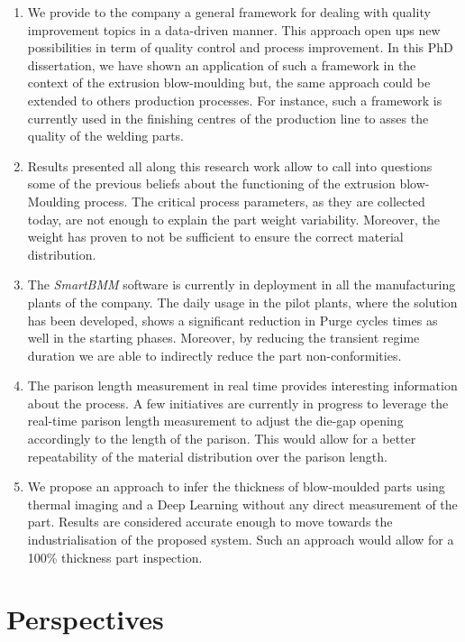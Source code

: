 \begin{enumerate}
    \item We provide to the company a general framework for dealing with quality improvement topics in a data-driven manner. This approach open ups new possibilities in term of quality control and process improvement. In this PhD dissertation, we have shown an application of such a framework in the context of the extrusion blow-moulding but, the same approach could be extended to others production processes. For instance, such a framework is currently used in the finishing centres of the production line to asses the quality of the welding parts.
    \item Results presented all along this research work allow to call into questions some of the previous beliefs about the functioning of the extrusion blow-Moulding process. The critical process parameters, as they are collected today, are not enough to explain the part weight variability. Moreover, the weight has proven to not be sufficient to ensure the correct material distribution. 
    \item The \textit{SmartBMM} software is currently in deployment in all the manufacturing plants of the company. The daily usage in the pilot plants, where the solution has been developed, shows a significant reduction in Purge cycles times as well in the starting phases. Moreover, by reducing the transient regime duration we are able to indirectly reduce the part non-conformities.
    \item The parison length measurement in real time provides interesting information about the process. A few initiatives are currently in progress to leverage the real-time parison length measurement to adjust the die-gap opening accordingly to the length of the parison. This would allow for a better repeatability of the material distribution over the parison length. 
    \item We propose an approach to infer the thickness of blow-moulded parts using thermal imaging and a Deep Learning without any direct measurement of the part. Results are considered accurate enough to move towards the industrialisation of the proposed system. Such an approach would allow for a 100\% thickness part inspection.   

\end{enumerate}

\section*{Perspectives}

